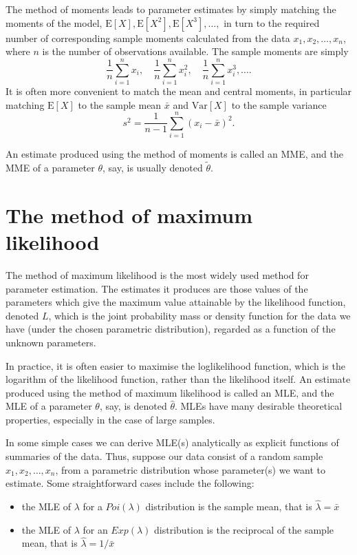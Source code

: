 \documentclass[landscape, 20pt]{extreport}
\theoremstyle{definition}
\theoremstyle{definition}
\theoremstyle{definition}
\theoremstyle{definition}
\theoremstyle{remark}
\begin{document}
The method of moments leads to parameter estimates by simply matching
the moments of the model,
\(\mathrm{E}[X], \mathrm{E}[X^2], \mathrm{E}[X^3], \ldots ,\) in turn to
the required number of corresponding sample moments calculated from the
data \(x_1, x_2, \ldots , x_n\), where \(n\) is the number of observations
available. The sample moments are simply
\[\frac{1}{n}\sum_{i=1}^n x_i, \quad  \frac{1}{n}\sum_{i=1}^n  x^2_i, \quad \frac{1}{n}\sum_{i=1}^n x^3_i, \ldots.\]
It is often more convenient to match the mean and central moments, in
particular matching \(\mathrm{E}[X]\) to the sample mean \(\bar{x}\) and
\(\mathrm{Var}[X]\) to the sample variance
\[s^2 = \frac{1}{n-1}\sum_{i=1}^n (x_i - \bar{x})^2.\]

An estimate produced using the method of moments is called an MME, and
the MME of a parameter \(\theta\), say, is usually denoted
\(\tilde{\theta}\).

\hypertarget{the-method-of-maximum-likelihood}{%
\section{The method of maximum likelihood}\label{the-method-of-maximum-likelihood}}

The method of maximum likelihood is the most widely used method for
parameter estimation. The estimates it produces are those values of the
parameters which give the maximum value attainable by the likelihood
function, denoted \(L\), which is the joint probability mass or density
function for the data we have (under the chosen parametric
distribution), regarded as a function of the unknown parameters.

In practice, it is often easier to maximise the loglikelihood function,
which is the logarithm of the likelihood function, rather than the
likelihood itself. An estimate produced using the method of maximum
likelihood is called an MLE, and the MLE of a parameter \(\theta\), say,
is denoted \(\hat{\theta}\). MLEs have many desirable theoretical
properties, especially in the case of large samples.

In some simple cases we can derive MLE(s) analytically as explicit
functions of summaries of the data. Thus, suppose our data consist of a
random sample \(x_1, x_2, \ldots , x_n\), from a parametric distribution
whose parameter(s) we want to estimate. Some straightforward cases
include the following:

\begin{itemize}
\item
  the MLE of \(\lambda\) for a \(Poi(\lambda)\) distribution is the sample
  mean, that is \(\hat{\lambda} = \bar{x}\)
\item
  the MLE of \(\lambda\) for an \(Exp(\lambda)\) distribution is the
  reciprocal of the sample mean, that is \(\hat{\lambda} = 1/\bar{x}\)
\end{itemize}
\end{document}
